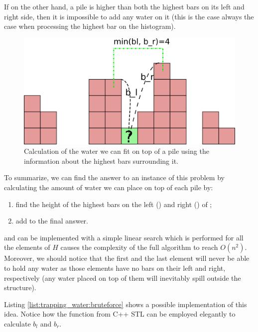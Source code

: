 If on the other hand, a pile is higher than both the highest bars on its left and right side, then it is impossible to add any water on it (this is the case always the case when processing the highest bar on the histogram).


\begin{figure}
	\centering
	\includegraphics[scale=1.0]{sources/trapping_water/images/example3}
	\caption{Calculation of the water we can fit on top of a pile using the information about the highest bars surrounding it.}
	\label{fig:trapping_water_example3}
\end{figure}

To summarize, we can find the answer to an instance of this problem by calculating the amount of water we can place on top of each pile  by:
\begin{enumerate}
	\item find the height of the highest bars on the left () and right () of ;
	\item add  to the final answer. 
\end{enumerate}
 and   can be implemented with a simple linear search which is performed for all the elements of $H$ causes the complexity of the full algorithm to reach $O(n^2)$.
Moreover, we should notice that the first and the last element will never be able to hold any water as those elements have no bars on their left and right, respectively (any water placed on top of them will inevitably spill outside the structure).

Listing \ref{list:trapping_water:bruteforce} shows a possible implementation of this idea. 
Notice how the  function from C++ STL can be employed elegantly to calculate $b_l$ and $b_r$.




